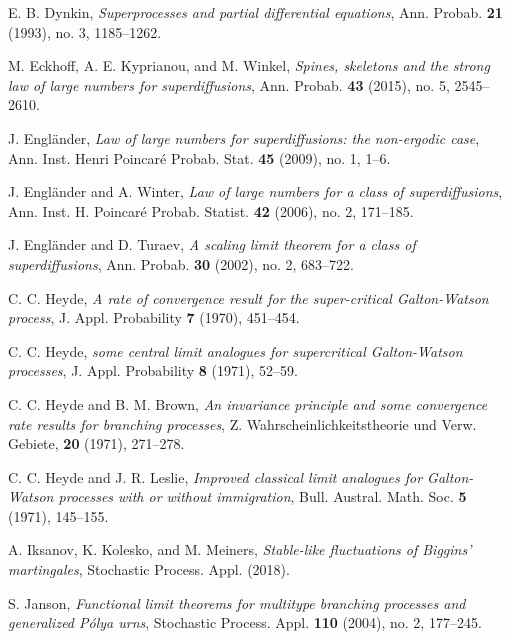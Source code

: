 \documentclass[12pt,a4paper]{amsart}
\theoremstyle{plain}
\theoremstyle{definition}
\numberwithin{equation}{section}
\begin{document}
\begin{thebibliography}{10}
  E. B. Dynkin, 
  \emph{Superprocesses and partial differential equations}, 
  Ann. Probab. \textbf{21} (1993), no. 3, 1185--1262.

  M. Eckhoff, A. E. Kyprianou, and M. Winkel, 
  \emph{Spines, skeletons and the strong law of large numbers for superdiffusions}, 
  Ann. Probab. \textbf{43} (2015), no. 5, 2545--2610.

  J. Engl\"{a}nder, 
  \emph{Law of large numbers for superdiffusions: the non-ergodic case}, 
  Ann. Inst. Henri Poincar\'{e} Probab. Stat. \textbf{45} (2009), no. 1, 1--6.

  J. Engl\"{a}nder and A. Winter, 
  \emph{Law of large numbers for a class of superdiffusions}, 
  Ann. Inst. H. Poincar\'{e} Probab. Statist. \textbf{42} (2006), no. 2, 171--185.

  J. Engl\"{a}nder and  D. Turaev, 
  \emph{A scaling limit theorem for a class of superdiffusions}, 
  Ann. Probab. \textbf{30} (2002), no. 2, 683--722.

  C. C. Heyde, 
  \emph{A rate of convergence result for the super-critical {G}alton-{W}atson process}, 
  J. Appl. Probability \textbf{7} (1970), 451--454.

  C. C. Heyde, 
  \emph{some central limit analogues for supercritical {G}alton-{W}atson processes}, 
  J. Appl. Probability \textbf{8} (1971), 52--59.

  C. C. Heyde and B. M. Brown, 
  \emph{An invariance principle and some convergence rate results for branching processes}, 
  Z. Wahrscheinlichkeitstheorie und Verw. Gebiete, \textbf{20} (1971), 271--278.

  C. C. Heyde and J. R. Leslie, 
  \emph{Improved classical limit analogues for {G}alton-{W}atson processes with or without immigration}, 
  Bull. Austral. Math. Soc. \textbf{5} (1971), 145--155.

  A. Iksanov, K. Kolesko, and M. Meiners, 
  \emph{Stable-like fluctuations of {B}iggins' martingales}, 
  Stochastic Process. Appl. (2018).

  S. Janson, 
  \emph{Functional limit theorems for multitype branching processes and generalized {P}\'{o}lya urns}, 
  Stochastic Process. Appl. \textbf{110} (2004), no. 2, 177--245.


\end{thebibliography}
\end{document}
